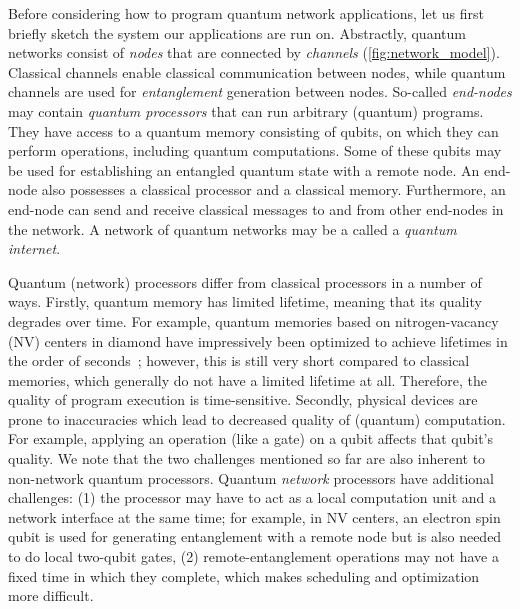 Before considering how to program quantum network applications, let us first briefly sketch the system our applications are run on.
Abstractly, quantum networks consist of \textit{nodes} that are connected by \textit{channels} (\cref{fig:network_model}).
Classical channels enable classical communication between nodes, while quantum channels are used for \textit{entanglement} generation between nodes.
So-called \textit{end-nodes} may contain \textit{quantum processors} that can run arbitrary (quantum) programs.
They have access to a quantum memory consisting of qubits, on which they can perform operations, including quantum computations.
Some of these qubits may be used for establishing an entangled quantum state with a remote node.
An end-node also possesses a classical processor and a classical memory.
Furthermore, an end-node can send and receive classical messages to and from other end-nodes in the network.
A network of quantum networks may be a called a \textit{quantum internet}.

Quantum (network) processors differ from classical processors in a number of ways.
Firstly, quantum memory has limited lifetime, meaning that its quality degrades over time.
For example, quantum memories based on nitrogen-vacancy (NV) centers in diamond have impressively been optimized to achieve lifetimes in the order of seconds~\cite{Abobeih2018};
however, this is still very short compared to classical memories, which generally do not have a limited lifetime at all.
Therefore, the quality of program execution is time-sensitive.
Secondly, physical devices are prone to inaccuracies which lead to decreased quality of (quantum) computation.
For example, applying an operation (like a gate) on a qubit affects that qubit's quality.
We note that the two challenges mentioned so far are also inherent to non-network quantum processors.
Quantum \textit{network} processors have additional challenges:
    (1) the processor may have to act as a local computation unit and a network interface at the same time;
    for example, in NV centers, an electron spin qubit is used for generating entanglement with a remote node but is also needed to do local two-qubit gates,
    (2) remote-entanglement operations may not have a fixed time in which they complete, which makes scheduling and optimization more difficult.

